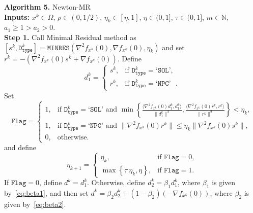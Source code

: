 \documentclass[11pt]{article}
\begin{document}
\begin{mdframed}
\noindent\textbf{Algorithm 5.} Newton-MR
\\[0.2cm]
\noindent\textbf{Inputs:} $x^{k}\in\Omega$, $\rho\in (0,1/2)$, $\eta_{k}\in [\eta,1]$, $\eta \in (0,1]$, $\tau \in (0,1]$, $m\in\mathbb{N}$, $a_{1}\geq 1>a_{2}>0$. 
\\[0.2cm]
\noindent\textbf{Step 1.} Call Minimal Residual method as $[s^{k},\texttt{D}_{\texttt{type}}^{k}] = \texttt{MINRES}\left(\nabla^{2}f_{x^{k}}(0),\nabla f_{x^{k}}(0),\eta_{k}\right)$ and set $r^{k}=-(\nabla^{2}f_{x^{k}}(0)s^{k}+\nabla f_{x^{k}}(0))$.
Define
\begin{equation} \label{eq:direction}
d_{1}^{k}=\left\{\begin{array}{ll} s^{k},&\text{if $\texttt{D}_{\texttt{type}}^{k}=\texttt{`SOL'}$},\\
r^{k},&\text{if $\texttt{D}_{\texttt{type}}^{k}=\texttt{`NPC'}$ }.
\end{array}
\right.
\end{equation}
Set 
\begin{equation} \label{eq:flag}
\texttt{Flag}=
\left\{
\begin{array}{ll} 
1, & \text{if } \texttt{D}_{\texttt{type}}^{k}=\texttt{`SOL'} 
\text{ and } \min\left\{\frac{\langle\nabla^{2}f_{x^{k}}(0)d_{1}^{k},d_{1}^{k}\rangle}{\|d_{1}^{k}\|^{2}},\frac{\langle\nabla^{2}f_{x^{k}}(0)r^{k},r^{k}\rangle}{\|r^{k}\|^{2}}\right\}<\eta_k,\\
1, & \text{if } \texttt{D}_{\texttt{type}}^{k}=\texttt{`NPC'} 
\text{ and } \|\nabla^{2}f_{x^{k}}(0)r^{k}\|\leq\eta_k\|\nabla^{2}f_{x^{k}}(0)s^{k}\|,\\
0, & \text{otherwise}.
\end{array}
\right.
\end{equation}
and define
\begin{equation} \label{eq:eta}
\eta_{k+1}=\left\{\begin{array}{ll} \eta_{k},&\text{if $\texttt{Flag}=0$},\\
\max\left\{\tau \  \eta_{k},\eta\right\},&\text{if $\texttt{Flag}=1$}.
\end{array}
\right.
\end{equation}
If $\texttt{Flag}=0$, define $d^{k}=d_{1}^{k}$. Otherwise, define $d_{2}^{k}=\beta_{1}d_{1}^{k}$, where $\beta_1$ is given by~\eqref{eq:beta1},
and then set
$d^{k}=\beta_{2}d_{2}^{k}+(1-\beta_{2})\left(-\nabla f_{x^{k}}(0)\right)$,
where $\beta_2$ is given by~\eqref{eq:beta2}.
\\[0.2cm]


\end{mdframed}
\end{document}
